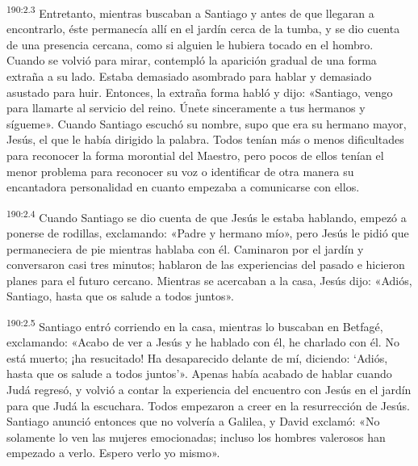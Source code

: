 \par 
\textsuperscript{190:2.3} Entretanto, mientras buscaban a Santiago y antes de que llegaran a encontrarlo, éste permanecía allí en el jardín cerca de la tumba, y se dio cuenta de una presencia cercana, como si alguien le hubiera tocado en el hombro. Cuando se volvió para mirar, contempló la aparición gradual de una forma extraña a su lado. Estaba demasiado asombrado para hablar y demasiado asustado para huir. Entonces, la extraña forma habló y dijo: «Santiago, vengo para llamarte al servicio del reino. Únete sinceramente a tus hermanos y sígueme». Cuando Santiago escuchó su nombre, supo que era su hermano mayor, Jesús, el que le había dirigido la palabra. Todos tenían más o menos dificultades para reconocer la forma morontial del Maestro, pero pocos de ellos tenían el menor problema para reconocer su voz o identificar de otra manera su encantadora personalidad en cuanto empezaba a comunicarse con ellos.

\par 
\textsuperscript{190:2.4} Cuando Santiago se dio cuenta de que Jesús le estaba hablando, empezó a ponerse de rodillas, exclamando: «Padre y hermano mío», pero Jesús le pidió que permaneciera de pie mientras hablaba con él. Caminaron por el jardín y conversaron casi tres minutos; hablaron de las experiencias del pasado e hicieron planes para el futuro cercano. Mientras se acercaban a la casa, Jesús dijo: «Adiós, Santiago, hasta que os salude a todos juntos».

\par 
\textsuperscript{190:2.5} Santiago entró corriendo en la casa, mientras lo buscaban en Betfagé, exclamando: «Acabo de ver a Jesús y he hablado con él, he charlado con él. No está muerto; ¡ha resucitado! Ha desaparecido delante de mí, diciendo: `Adiós, hasta que os salude a todos juntos'». Apenas había acabado de hablar cuando Judá regresó, y volvió a contar la experiencia del encuentro con Jesús en el jardín para que Judá la escuchara. Todos empezaron a creer en la resurrección de Jesús. Santiago anunció entonces que no volvería a Galilea, y David exclamó: «No solamente lo ven las mujeres emocionadas; incluso los hombres valerosos han empezado a verlo. Espero verlo yo mismo».

